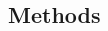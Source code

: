 \documentclass[11pt]{article}
\begin{document}
\begin{spacing}{1.3}



\section{Methods}
\label{scn:methods}



\end{spacing}
\end{document}
